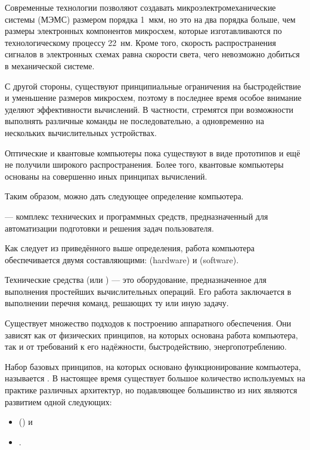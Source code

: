 Современные технологии позволяют создавать микроэлектромеханические
системы (МЭМС) размером порядка 1~мкм, но это на два порядка больше,
чем размеры электронных компонентов микросхем, которые изготавливаются
по технологическому процессу 22~нм. Кроме того, скорость
распространения сигналов в электронных схемах равна скорости света,
чего невозможно добиться в механической системе.

С другой стороны, существуют принципиальные ограничения на
быстродействие и уменьшение размеров микросхем, поэтому в последнее
время особое внимание уделяют эффективности вычислений. В частности,
стремятся при возможности выполнять различные команды не
последовательно, а одновременно на нескольких вычислительных
устройствах.

Оптические и квантовые компьютеры пока существуют в виде прототипов и
ещё не получили широкого распространения. Более того, квантовые
компьютеры основаны на совершенно иных принципах вычислений.

Таким образом, можно дать следующее определение компьютера.

\begin{defn}
   — комплекс технических и программных
  средств, предназначенный для автоматизации подготовки и решения
  задач пользователя.
\end{defn}

Как следует из приведённого выше определения, работа компьютера
обеспечивается двумя составляющими:
 (hardware) и
 (software).

Технические средства (или ) — это оборудование, предназначенное для выполнения
простейших вычислительных операций. Его работа заключается в
выполнении перечня команд, решающих ту или иную задачу.

Существует множество подходов к построению аппаратного
обеспечения. Они зависят как от физических принципов, на которых
основана работа компьютера, так и от требований к его надёжности,
быстродействию, энергопотреблению.

Набор базовых принципов, на которых основано функционирование
компьютера, называется . В
настоящее время существует большое количество используемых на практике
различных архитектур, но подавляющее большинство из них являются
развитием одной следующих:

\begin{itemize}
\item {}
  () и
\item {}.
\end{itemize}


